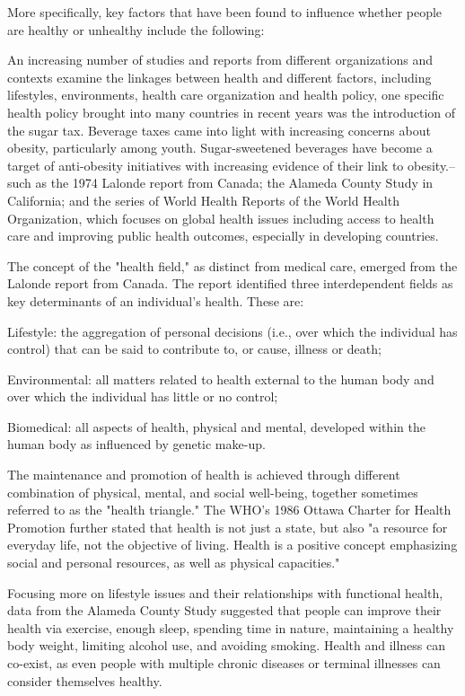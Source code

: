 More specifically, key factors that have been found to influence whether
people are healthy or unhealthy include the following:

An increasing number of studies and reports from different organizations
and contexts examine the linkages between health and different factors,
including lifestyles, environments, health care organization and health
policy, one specific health policy brought into many countries in recent
years was the introduction of the sugar tax. Beverage taxes came into
light with increasing concerns about obesity, particularly among youth.
Sugar-sweetened beverages have become a target of anti-obesity
initiatives with increasing evidence of their link to obesity.-- such as
the 1974 Lalonde report from Canada; the Alameda County Study in
California; and the series of World Health Reports of the World Health
Organization, which focuses on global health issues including access to
health care and improving public health outcomes, especially in
developing countries.

The concept of the "health field," as distinct from medical care,
emerged from the Lalonde report from Canada. The report identified three
interdependent fields as key determinants of an individual's health.
These are:

Lifestyle: the aggregation of personal decisions (i.e., over which the
individual has control) that can be said to contribute to, or cause,
illness or death;

Environmental: all matters related to health external to the human body
and over which the individual has little or no control;

Biomedical: all aspects of health, physical and mental, developed within
the human body as influenced by genetic make-up.

The maintenance and promotion of health is achieved through different
combination of physical, mental, and social well-being, together
sometimes referred to as the "health triangle." The WHO's 1986 Ottawa
Charter for Health Promotion further stated that health is not just a
state, but also "a resource for everyday life, not the objective of
living. Health is a positive concept emphasizing social and personal
resources, as well as physical capacities."

Focusing more on lifestyle issues and their relationships with
functional health, data from the Alameda County Study suggested that
people can improve their health via exercise, enough sleep, spending
time in nature, maintaining a healthy body weight, limiting alcohol use,
and avoiding smoking. Health and illness can co-exist, as even people
with multiple chronic diseases or terminal illnesses can consider
themselves healthy.

